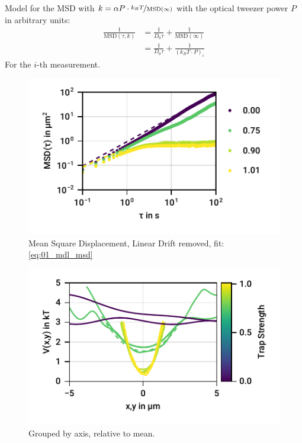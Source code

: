 \documentclass[
    parskip=half, 
    twoside=false,
    twocolumn=true,
    fontsize=11pt,
]{scrarticle}
\begin{document}
Model for the MSD with $k=\alpha P \cdot\nicefrac{k_B T}{\text{MSD}(\infty)}$ with the optical tweezer power $P$ in arbitrary units:
\begin{align}
    \frac{1}{\text{MSD}(\tau, k)}
    &= \frac{1}{D_0 \tau} + \frac{1}{\text{MSD}(\infty)}\\
    &= \frac{1}{D_0 \tau} + \frac{1}{(k_B T \cdot P)_i}
    \label{eq:01_mdl_msd} 
\end{align}
For the $i$-th measurement.

\begin{figure}[h]
    \centering
    \includegraphics{figures/01_02_2_msd.pdf}
    \caption{Mean Square Displacement, Linear Drift removed, fit: \autoref{eq:01_mdl_msd}}
\end{figure}


\begin{figure}[h]
    \centering
    \includegraphics{figures/01_03_3_axis.pdf}
    \caption{Grouped by axis, relative to mean.}
\end{figure}
\end{document}
